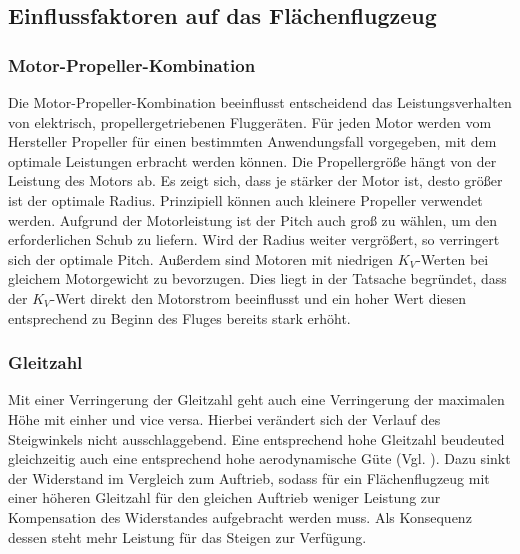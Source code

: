\subsection{Einflussfaktoren auf das Flächenflugzeug}

\subsubsection{Motor-Propeller-Kombination}
Die Motor-Propeller-Kombination beeinflusst entscheidend das Leistungsverhalten von elektrisch, propellergetriebenen Fluggeräten. Für jeden Motor werden vom Hersteller Propeller für einen bestimmten Anwendungsfall vorgegeben, mit dem optimale Leistungen erbracht werden können. Die Propellergröße hängt von der Leistung des Motors ab. Es zeigt sich, dass je stärker der Motor ist, desto größer ist der optimale Radius. Prinzipiell können auch kleinere Propeller verwendet werden. Aufgrund der Motorleistung ist der Pitch auch groß zu wählen, um den erforderlichen Schub zu liefern. Wird der Radius weiter vergrößert, so verringert sich der optimale Pitch. Außerdem sind Motoren mit niedrigen \ensuremath{K_V}-Werten bei gleichem Motorgewicht zu bevorzugen. Dies liegt in der Tatsache begründet, dass der \ensuremath{K_V}-Wert direkt den Motorstrom beeinflusst und ein hoher Wert diesen entsprechend zu Beginn des Fluges bereits stark erhöht. 


\subsubsection{Gleitzahl}
Mit einer Verringerung der Gleitzahl geht auch eine Verringerung der maximalen Höhe mit einher und vice versa. Hierbei verändert sich der Verlauf des Steigwinkels nicht ausschlaggebend. Eine entsprechend hohe Gleitzahl beudeuted gleichzeitig auch eine entsprechend hohe aerodynamische Güte (Vgl. \cite{Scheiderer.2008}). Dazu sinkt der Widerstand im Vergleich zum Auftrieb, sodass für ein Flächenflugzeug mit einer höheren Gleitzahl für den gleichen Auftrieb weniger Leistung zur Kompensation des Widerstandes aufgebracht werden muss. Als Konsequenz dessen steht mehr Leistung für das Steigen zur Verfügung.

